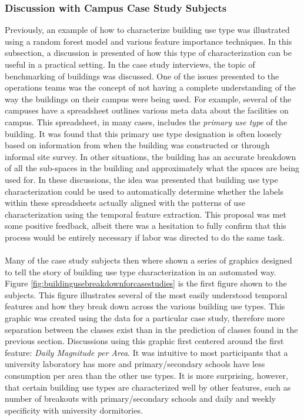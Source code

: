 \subsubsection{Discussion with Campus Case Study Subjects}
\label{sec:buildinguseclassificationdiscussion}

Previously, an example of how to characterize building use type was illustrated using a random forest model and various feature importance techniques. In this subsection, a discussion is presented of how this type of characterization can be useful in a practical setting. In the case study interviews, the topic of benchmarking of buildings was discussed. One of the issues presented to the operations teams was the concept of not having a complete understanding of the way the buildings on their campus were being used. For example, several of the campuses have a spreadsheet outlines various meta data about the facilities on campus. This spreadsheet, in many cases, includes the \emph{primary use type} of the building. It was found that this primary use type designation is often loosely based on information from when the building was constructed or through informal site survey. In other situations, the building has an accurate breakdown of all the sub-spaces in the building and approximately what the spaces are being used for. In these discussions, the idea was presented that building use type characterization could be used to automatically determine whether the labels within these spreadsheets actually aligned with the patterns of use characterization using the temporal feature extraction. This proposal was met some positive feedback, albeit there was a hesitation to fully confirm that this process would be entirely necessary if labor was directed to do the same task.\\
\\
Many of the case study subjects then where shown a series of graphics designed to tell the story of building use type characterization in an automated way. Figure \ref{fig:buildingusebreakdownforcasestudies} is the first figure shown to the subjects. This figure illustrates several of the most easily understood temporal features and how they break down across the various building use types. This graphic was created using the data for a particular case study, therefore more separation between the classes exist than in the prediction of classes found in the previous section. Discussions using this graphic first centered around the first feature: \emph{Daily Magnitude per Area}. It was intuitive to most participants that a university laboratory has more  and primary/secondary schools have less consumption per area than the other use types. It is more surprising, however, that certain building use types are characterized well by other features, such as number of breakouts with primary/secondary schools and daily and weekly specificity with university dormitories.

